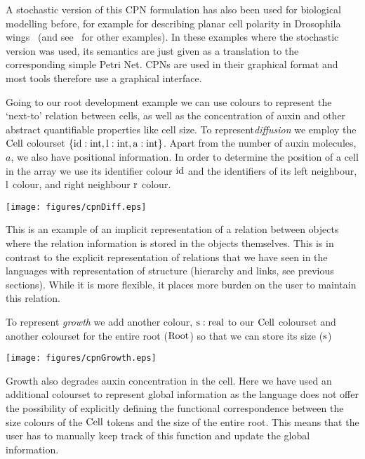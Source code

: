 A stochastic version of this CPN formulation has also been used for biological
modelling before, for example for describing planar cell polarity in Drosophila
wings~\citep{gao_multiscale_2013} (and see~\citet{runge_application_2004,
gilbert_colouring_2013} for other examples). In these examples where the
stochastic version was used, its semantics are just given as a translation to
the corresponding simple Petri Net. CPNs are used in their graphical format and
most tools therefore use a graphical interface.

Going to our root development example we can use colours to represent the
`next-to' relation between cells, as well as the concentration of auxin and
other abstract quantifiable properties like cell size. To represent\emph{diffusion} we
employ the $\mathrm{Cell}$ colourset $\{\mathrm{id}: \mathrm{int}, \mathrm{l}:\mathrm{int},
\mathrm{a}:\mathrm{int} \} $. Apart from the number of auxin molecules, $a$, we also have
positional information. In order to determine the position of a cell in the
array we use its identifier colour $\mathrm{id}$ and the identifiers of its left
neighbour, $\mathrm{l}$ colour, and right neighbour $\mathrm{r}$ colour.
\begin{center}
    \texttt{[image: figures/cpnDiff.eps]}
\end{center}
This is an example of an implicit representation of a relation between objects
where the relation information is stored in the objects themselves. This is in
contrast to the explicit representation of relations that we have seen in the
languages with representation of structure (hierarchy and links, see
previous sections). While it is more flexible, it places more burden on the user
to maintain this relation.

To represent \emph{growth} we add another colour,
$\mathrm{s}:\rm{real}$ to our $\mathrm{Cell}$ colourset and another colourset for the
entire root ($\mathrm{Root}$) so that we can store its size ($\rm{s}$)
\begin{center}
    \texttt{[image: figures/cpnGrowth.eps]}
\end{center}
Growth also degrades auxin concentration in the cell. Here we have used an
additional colourset to represent global information as the language does not
offer the possibility of explicitly defining the functional correspondence
between the size colours of the $\mathrm{Cell}$ tokens and the size of the entire
root. This means that the user has to manually keep track of this function and
update the global information.

